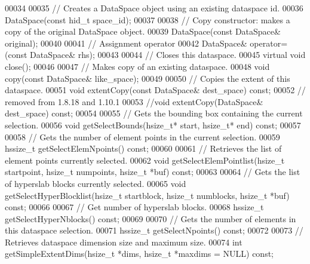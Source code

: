 \begin{DoxyCode}
00034 
00035         \textcolor{comment}{// Creates a DataSpace object using an existing dataspace id.}
00036         DataSpace(\textcolor{keyword}{const} hid\_t space\_id);
00037 
00038         \textcolor{comment}{// Copy constructor: makes a copy of the original DataSpace object.}
00039         DataSpace(\textcolor{keyword}{const} DataSpace& original);
00040 
00041         \textcolor{comment}{// Assignment operator}
00042         DataSpace& operator=(\textcolor{keyword}{const} DataSpace& rhs);
00043 
00044         \textcolor{comment}{// Closes this dataspace.}
00045         \textcolor{keyword}{virtual} \textcolor{keywordtype}{void} close();
00046 
00047         \textcolor{comment}{// Makes copy of an existing dataspace.}
00048         \textcolor{keywordtype}{void} copy(\textcolor{keyword}{const} DataSpace& like\_space);
00049 
00050         \textcolor{comment}{// Copies the extent of this dataspace.}
00051         \textcolor{keywordtype}{void} extentCopy(\textcolor{keyword}{const} DataSpace& dest\_space) \textcolor{keyword}{const};
00052         \textcolor{comment}{// removed from 1.8.18 and 1.10.1}
00053         \textcolor{comment}{//void extentCopy(DataSpace& dest\_space) const;}
00054 
00055         \textcolor{comment}{// Gets the bounding box containing the current selection.}
00056         \textcolor{keywordtype}{void} getSelectBounds(hsize\_t* start, hsize\_t* end) \textcolor{keyword}{const};
00057 
00058         \textcolor{comment}{// Gets the number of element points in the current selection.}
00059         hssize\_t getSelectElemNpoints() \textcolor{keyword}{const};
00060 
00061         \textcolor{comment}{// Retrieves the list of element points currently selected.}
00062         \textcolor{keywordtype}{void} getSelectElemPointlist(hsize\_t startpoint, hsize\_t numpoints, hsize\_t *buf) \textcolor{keyword}{const};
00063 
00064         \textcolor{comment}{// Gets the list of hyperslab blocks currently selected.}
00065         \textcolor{keywordtype}{void} getSelectHyperBlocklist(hsize\_t startblock, hsize\_t numblocks, hsize\_t *buf) \textcolor{keyword}{const};
00066 
00067         \textcolor{comment}{// Get number of hyperslab blocks.}
00068         hssize\_t getSelectHyperNblocks() \textcolor{keyword}{const};
00069 
00070         \textcolor{comment}{// Gets the number of elements in this dataspace selection.}
00071         hssize\_t getSelectNpoints() \textcolor{keyword}{const};
00072 
00073         \textcolor{comment}{// Retrieves dataspace dimension size and maximum size.}
00074         \textcolor{keywordtype}{int} getSimpleExtentDims(hsize\_t *dims, hsize\_t *maxdims = NULL) \textcolor{keyword}{const};

\end{DoxyCode}
